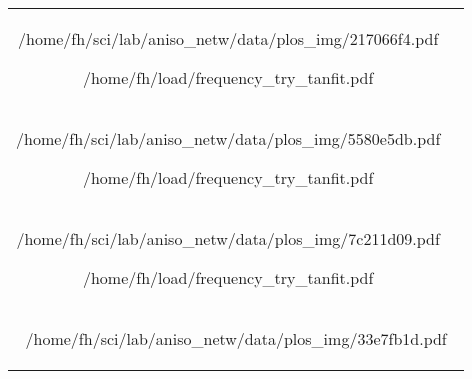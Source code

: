 \begin{tabular}{cc} 

  \begin{overpic}[width=\wx]%
    {/home/fh/sci/lab/aniso_netw/data/plos_img/217066f4.pdf} %
  \end{overpic}

  \begin{overpic}[width=\wy]%
    {/home/fh/load/frequency_try_tanfit.pdf}
  \end{overpic}
  \\

  \begin{overpic}[width=\wx]%
    {/home/fh/sci/lab/aniso_netw/data/plos_img/5580e5db.pdf} %
  \end{overpic}
  
  \begin{overpic}[width=\wy]%
    {/home/fh/load/frequency_try_tanfit.pdf}
  \end{overpic}

  \\
  
  \begin{overpic}[width=\wx]%
    {/home/fh/sci/lab/aniso_netw/data/plos_img/7c211d09.pdf} %
  \end{overpic}

  \begin{overpic}[width=\wy]%
    {/home/fh/load/frequency_try_tanfit.pdf}
  \end{overpic}

  \\

  \multicolumn{2}{c}{
      \begin{overpic}[width=\wx+\wy]%
        {/home/fh/sci/lab/aniso_netw/data/plos_img/33e7fb1d.pdf} %
      \end{overpic}
  }
  



\end{tabular}
